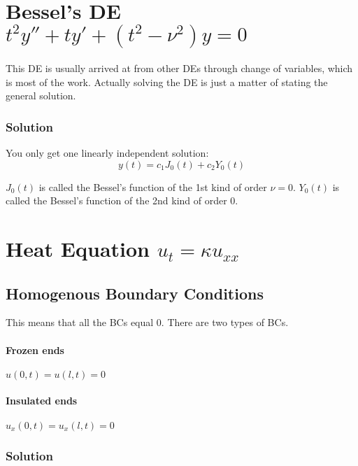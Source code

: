 \documentclass[11pt]{article}
\begin{document}
\section{Bessel's DE $t^2y''+ty'+(t^2-\nu^2)y=0$}
This DE is usually arrived at from other DEs through change of variables, which is most of the work. Actually solving the DE is just a matter of stating the general solution.

\subsubsection*{Solution}
You only get one linearly independent solution:
$$ y(t) = c_1J_0(t) + c_2Y_0(t) $$

$J_0(t)$ is called the Bessel's function of the 1st kind of order $\nu=0$.
$Y_0(t)$ is called the Bessel's function of the 2nd kind of order 0. 


\section{Heat Equation $u_t=\kappa u_{xx}$}

\subsection{Homogenous Boundary Conditions}
This means that all the BCs equal 0. There are two types of BCs.

\paragraph{Frozen ends} $u(0,t) = u(l,t) = 0$
\paragraph{Insulated ends} $u_x(0,t) = u_x(l,t) = 0$

\subsubsection*{Solution}
\end{document}
